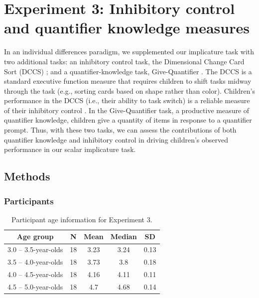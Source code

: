 \documentclass[man]{apa2}
\begin{document}
\section{Experiment 3: Inhibitory control and quantifier knowledge measures}


In an individual differences paradigm, we supplemented our implicature task with two additional tasks: an inhibitory control task, the Dimensional Change Card Sort (DCCS) \cite{zelazo2006}; and a quantifier-knowledge task, Give-Quantifier \cite{barner2009}. The DCCS is a standard executive function measure that requires children to shift tasks midway through the task (e.g., sorting cards based on shape rather than color). Children's performance in the DCCS (i.e., their ability to task switch) is a reliable measure of their inhibitory control \cite{zelazo2006}. In the Give-Quantifier task, a productive measure of quantifier knowledge, children give a quantity of items in response to a quantifier prompt. Thus, with these two tasks, we can assess the contributions of both quantifier knowledge and inhibitory control in driving children's observed performance in our scalar implicature task.

\subsection{Methods}

\subsubsection{Participants}

\begin{table}[tb]
\centering
\begin{tabular}{ccccc}
\hline
{\bf Age group} & {\bf N} & {\bf Mean} & {\bf Median} & {\bf SD} \\
\hline
3.0 -- 3.5-year-olds & 18 & 3.23 & 3.24 & 0.13\\
3.5 -- 4.0-year-olds & 18 & 3.73 & 3.8 & 0.18\\
4.0 -- 4.5-year-olds & 18 & 4.16 & 4.11 & 0.11\\
4.5 -- 5.0-year-olds & 18 & 4.7 & 4.68 & 0.14\\
\hline
\end{tabular}
\caption{\label{tab:exp_3_demo}Participant age information for Experiment 3.}
\end{table}
\end{document}
